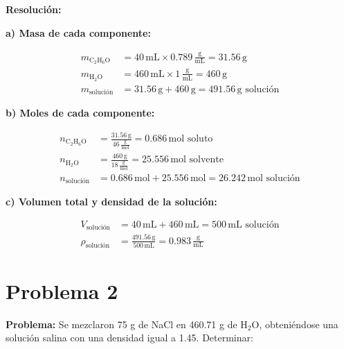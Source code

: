 \documentclass{article}
\begin{document}

\noindent\textbf{Resolución:} %

\textbf{a) Masa de cada componente:}

\begin{align*}
    m_{\text{C}_2\text{H}_6\text{O}} &= 40 \, \text{mL} \times 0.789 \, \frac{\text{g}}{\text{mL}} = 31.56 \, \text{g} \\[10pt]
    m_{\text{H}_2\text{O}} &= 460 \, \text{mL} \times 1 \, \frac{\text{g}}{\text{mL}} = 460 \, \text{g} \\[10pt]
    m_{\text{solución}} &= 31.56 \, \text{g} + 460 \, \text{g} = 491.56 \, \text{g solución}
\end{align*}

\textbf{b) Moles de cada componente:}

\begin{align*}
    n_{\text{C}_2\text{H}_6\text{O}} &= \frac{31.56 \, \text{g}}{46 \, \frac{\text{g}}{\text{mol}}} = 0.686 \, \text{mol soluto} \\[10pt]
    n_{\text{H}_2\text{O}} &= \frac{460 \, \text{g}}{18 \, \frac{\text{g}}{\text{mol}}} = 25.556 \, \text{mol solvente} \\[10pt]
    n_{\text{solución}} &= 0.686 \, \text{mol} + 25.556 \, \text{mol} = 26.242 \, \text{mol solución}
\end{align*}

\textbf{c) Volumen total y densidad de la solución:}

\begin{align*}
    V_{\text{solución}} &= 40 \, \text{mL} + 460 \, \text{mL} = 500 \, \text{mL solución} \\[10pt]
    \rho_{\text{solución}} &= \frac{491.56 \, \text{g}}{500 \, \text{mL}} = 0.983 \, \frac{\text{g}}{\text{mL}}
\end{align*}










\newpage
\section*{Problema 2}
\textbf{Problema:}
Se mezclaron 75 g de NaCl en 460.71 g de H$_2$O, obteniéndose una solución salina con una densidad igual a 1.45. Determinar:
\end{document}
